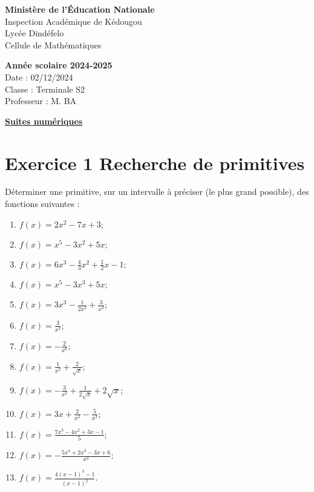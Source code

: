 \documentclass[12pt]{article}
\begin{document}
\noindent
\begin{minipage}[t]{0.48\textwidth}
\raggedright
\textbf{Ministère de l'Éducation Nationale}\\
Inspection Académique de Kédougou\\
Lycée Dindéfelo\\
Cellule de Mathématiques
\end{minipage}
\hfill
\begin{minipage}[t]{0.48\textwidth}
\raggedleft
\textbf{Année scolaire 2024-2025}\\
Date : 02/12/2024\\
Classe : Terminale S2\\
Professeur : M. BA
\end{minipage}
\begin{center}
\underline{\textbf{Suites numériques}}
\end{center}
\vspace{1cm}
\section*{Exercice 1 \quad Recherche de primitives}

Déterminer une primitive, sur un intervalle à préciser (le plus grand possible), des fonctions suivantes :

\begin{enumerate}
    \item $f(x) = 2x^2 -7x + 3;$
    \item $f(x) = x^5 - 3x^2 + 5x;$
    \item $f(x) = 6x^3 - \frac{4}{3}x^2 + \frac{1}{2}x-1;$
    \item $f(x) = x^5 -3x^{3}+ 5x;$
    \item $f(x) = 3x^{3}-\frac{1}{2x^2} + \frac{3}{x^3};$
    \item $f(x) = \frac{3}{x^2};$
    \item $f(x) = -\frac{2}{x^6};$
    \item $f(x) = \frac{1}{x^2} + \frac{2}{\sqrt{x}};$
    \item $f(x) = -\frac{3}{x^2} + \frac{1}{2\sqrt{x}} + 2\sqrt{x};$
    \item $f(x) = 3x + \frac{2}{x^2} - \frac{5}{x^3};$
    \item $f(x) = \frac{7x^3 - 4x^2 + 3x - 1}{5};$
    \item $f(x) = -\frac{5x^4 + 2x^3 - 3x + 6}{x^3};$
    \item $f(x)=\frac{4(x-1)^{3}-1}{(x-1)^{2}}.$
\end{enumerate}
\end{document}
